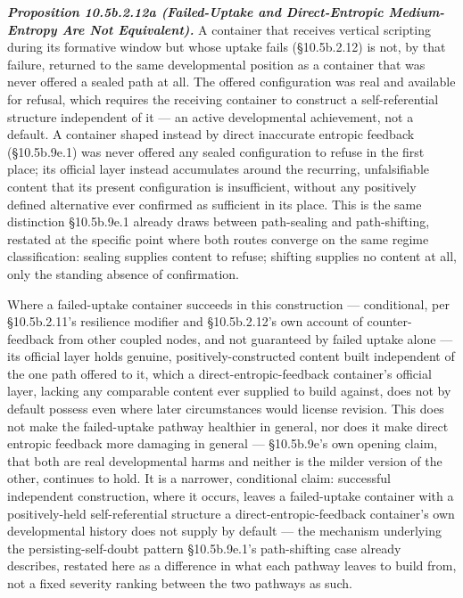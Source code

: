 \documentclass[
]{article}
\begin{document}
\emph{\textbf{Proposition 10.5b.2.12a (Failed-Uptake and
Direct-Entropic Medium-Entropy Are Not Equivalent).}} A container that
receives vertical scripting during its formative window but whose
uptake fails (§10.5b.2.12) is not, by that failure, returned to the same
developmental position as a container that was never offered a sealed
path at all. The offered configuration was real and available for
refusal, which requires the receiving container to construct a
self-referential structure independent of it --- an active developmental
achievement, not a default. A container shaped instead by direct
inaccurate entropic feedback (§10.5b.9e.1) was never offered any sealed
configuration to refuse in the first place; its official layer instead
accumulates around the recurring, unfalsifiable content that its present
configuration is insufficient, without any positively defined
alternative ever confirmed as sufficient in its place. This is the same
distinction §10.5b.9e.1 already draws between path-sealing and
path-shifting, restated at the specific point where both routes converge
on the same regime classification: sealing supplies content to refuse;
shifting supplies no content at all, only the standing absence of
confirmation.

Where a failed-uptake container succeeds in this construction ---
conditional, per §10.5b.2.11's resilience modifier and §10.5b.2.12's own
account of counter-feedback from other coupled nodes, and not guaranteed
by failed uptake alone --- its official layer holds genuine,
positively-constructed content built independent of the one path offered
to it, which a direct-entropic-feedback container's official layer,
lacking any comparable content ever supplied to build against, does not
by default possess even where later circumstances would license
revision. This does not make the failed-uptake pathway healthier in
general, nor does it make direct entropic feedback more damaging in
general --- §10.5b.9e's own opening claim, that both are real
developmental harms and neither is the milder version of the other,
continues to hold. It is a narrower, conditional claim: successful
independent construction, where it occurs, leaves a failed-uptake
container with a positively-held self-referential structure a
direct-entropic-feedback container's own developmental history does not
supply by default --- the mechanism underlying the persisting-self-doubt
pattern §10.5b.9e.1's path-shifting case already describes, restated
here as a difference in what each pathway leaves to build from, not a
fixed severity ranking between the two pathways as such.
\end{document}

